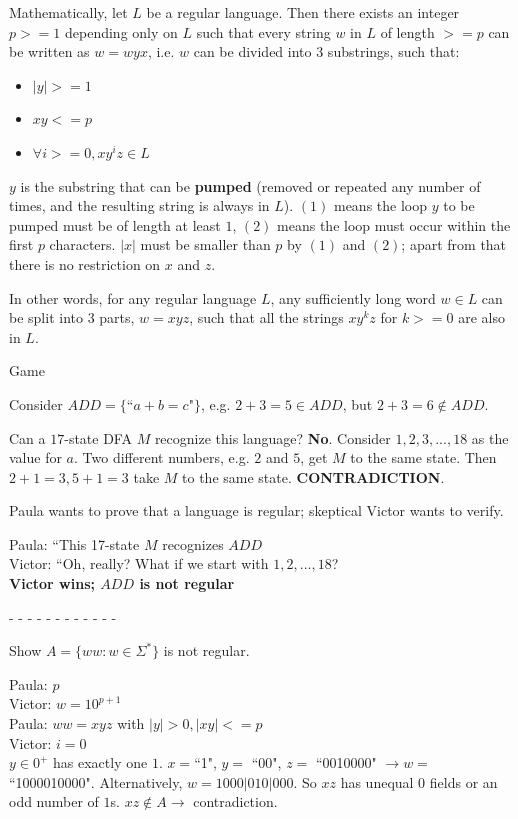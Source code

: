 \documentclass[2pt,legalpaper]{scrartcl}
\makeatletter
\renewcommand{\subsubsection}{\@startsection{subsubsection}{3}{0mm}
  {-1ex plus -.5ex minus -.2ex}
  {1ex plus .2ex}
{\normalfont\small\bfseries}}
\makeatother
\begin{document}
\begin{multicols}{6}
  Mathematically, let $L$ be a regular language. Then there exists an integer $p >= 1$ depending only on $L$ such that every string $w$ in $L$ of length $>= p$ can be written as $w = wyx$, i.e. $w$ can be divided into 3 substrings, such that:

  \begin{itemize}
    \item $|y| >= 1$
    \item $xy <= p$
    \item $\forall i >= 0, xy^iz \in L$
  \end{itemize}

  $y$ is the substring that can be {\bf pumped} (removed or repeated any number of times, and the resulting string is always in $L$). $(1)$ means the loop $y$ to be pumped must be of length at least $1$, $(2)$ means the loop must occur within the first $p$ characters. $|x|$ must be smaller than $p$ by $(1)$ and $(2)$; apart from that there is no restriction on $x$ and $z$.

  In other words, for any regular language $L$, any sufficiently long word $w \in L$ can be split into $3$ parts, $w = xyz$, such that all the strings $xy^kz$ for $k >= 0$ are also in $L$.

  \subsubsection{Game}

  Consider $ADD = \{$``$a + b = c$"$\}$, e.g. $2 + 3 = 5 \in ADD$, but $2 + 3 = 6 \notin ADD$.

  Can a $17$-state DFA $M$ recognize this language? {\bf No}. Consider $1, 2, 3, ..., 18$ as the value for $a$. Two different numbers, e.g. $2$ and $5$, get $M$ to the same state. Then $2 + 1 = 3, 5 + 1 = 3$ take $M$ to the same state. {\bf CONTRADICTION}.

  Paula wants to prove that a language is regular; skeptical Victor wants to verify.

  Paula: ``This 17-state $M$ recognizes $ADD$\\
  Victor: ``Oh, really? What if we start with $1, 2, ..., 18$?\\
  {\bf Victor wins; $ADD$ is not regular}

  - - - - - - - - - - - - 

  Show $A = \{ww: w \in \Sigma^*\}$ is not regular.

  Paula: $p$\\
  Victor: $w = 10^{p+1}$\\
  Paula: $ww = xyz$ with $|y| > 0, |xy| <= p$\\
  Victor: $i = 0$\\
  $y \in 0^+$ has exactly one $1$. $x = $``1", $y =$ ``00", $z =$ ``0010000" $\rightarrow w =$ ``1000010000". Alternatively, $w = 1000|010|000$. So $xz$ has unequal $0$ fields or an odd number of $1$s. $xz \notin A \rightarrow$ contradiction.


\end{multicols}
\end{document}
